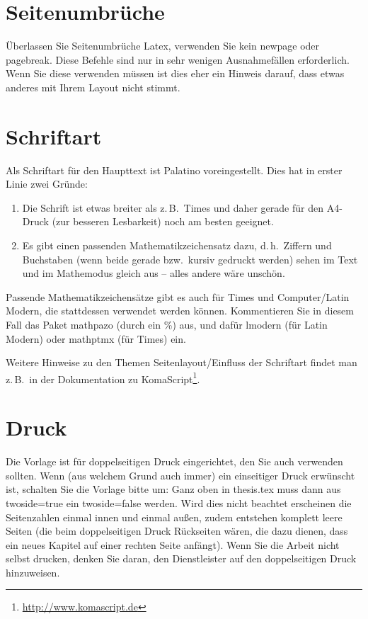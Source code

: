 \section{Seitenumbrüche}
Überlassen Sie Seitenumbrüche Latex, verwenden Sie kein newpage oder pagebreak.
Diese Befehle sind nur in sehr wenigen Ausnahmefällen erforderlich.
Wenn Sie diese verwenden müssen ist dies eher ein Hinweis darauf, dass etwas anderes mit Ihrem Layout nicht stimmt.

\section{Schriftart}
Als Schriftart für den Haupttext ist Palatino voreingestellt.
Dies hat in erster Linie zwei Gründe:
\begin{enumerate}
	\item
	Die Schrift ist etwas breiter als z.\,B.\ Times und daher gerade für den A4-Druck (zur besseren Lesbarkeit) noch am besten geeignet.
	\item
	Es gibt einen passenden Mathematikzeichensatz dazu, d.\,h.\ Ziffern und Buchstaben (wenn beide gerade bzw.\ kursiv gedruckt werden) sehen im Text und im Mathemodus gleich aus -- alles andere wäre unschön.
\end{enumerate}
Passende Mathematikzeichensätze gibt es auch für Times und Computer/Latin Modern, die stattdessen verwendet werden können.
Kommentieren Sie in diesem Fall das Paket mathpazo (durch ein \%) aus, und dafür lmodern (für Latin Modern) oder mathptmx (für Times) ein.

Weitere Hinweise zu den Themen Seitenlayout/Einfluss der Schriftart findet man z.\,B.\ in der Dokumentation zu KomaScript\footnote{\url{http://www.komascript.de}}.


\section{Druck}
Die Vorlage ist für doppelseitigen Druck eingerichtet, den Sie auch verwenden sollten.
Wenn (aus welchem Grund auch immer) ein einseitiger Druck erwünscht ist, schalten Sie die Vorlage bitte um: Ganz oben in thesis.tex muss dann aus twoside=true ein twoside=false werden.
Wird dies  nicht beachtet erscheinen die Seitenzahlen einmal innen und einmal außen, zudem entstehen komplett leere Seiten (die beim doppelseitigen Druck Rückseiten wären, die dazu dienen, dass ein neues Kapitel auf einer rechten Seite anfängt).
Wenn Sie die Arbeit nicht selbst drucken, denken Sie daran, den Dienstleister auf den doppelseitigen Druck hinzuweisen.



